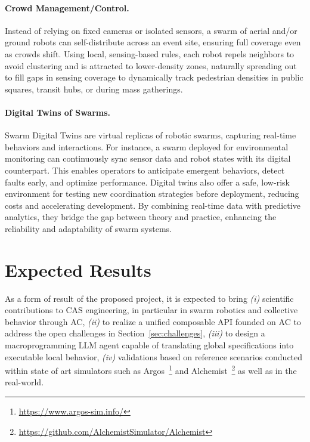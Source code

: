 \documentclass[12pt]{article}
\begin{document}
\paragraph{Crowd Management/Control.} 
Instead of relying on fixed cameras or isolated sensors, a swarm of aerial and/or ground robots can self-distribute across an event site, ensuring full coverage even as crowds shift.
Using local, sensing-based rules, each robot repels neighbors to avoid clustering and is attracted to lower-density zones, naturally spreading out to fill gaps in sensing coverage
to dynamically track pedestrian densities in public squares, transit hubs, or during mass gatherings.

\paragraph{Digital Twins of Swarms.}
Swarm Digital Twins are virtual replicas of robotic swarms, capturing real-time behaviors and interactions. For instance, a swarm deployed for environmental monitoring can continuously sync sensor data and robot states with its digital counterpart. This enables operators to anticipate emergent behaviors, detect faults early, and optimize performance. Digital twins also offer a safe, low-risk environment for testing new coordination strategies before deployment, reducing costs and accelerating development. By combining real-time data with predictive analytics, they bridge the gap between theory and practice, enhancing the reliability and adaptability of swarm systems.


\section{Expected Results}
As a form of result of the proposed project, it is expected to bring \textit{(i)} scientific contributions to CAS engineering, in particular in swarm robotics and collective behavior through AC,
\textit{(ii)} to realize a unified composable API founded on AC to address the open challenges in Section~\ref{sec:challenges}, 
\textit{(iii)} to design a macroprogramming LLM agent capable of translating global specifications into executable local behavior,
\textit{(iv)} validations based on reference scenarios conducted within state of art simulators such as Argos~\footnote{\url{https://www.argos-sim.info/}} and Alchemist~\footnote{\url{https://github.com/AlchemistSimulator/Alchemist}} as well
as in the real-world.
\end{document}
